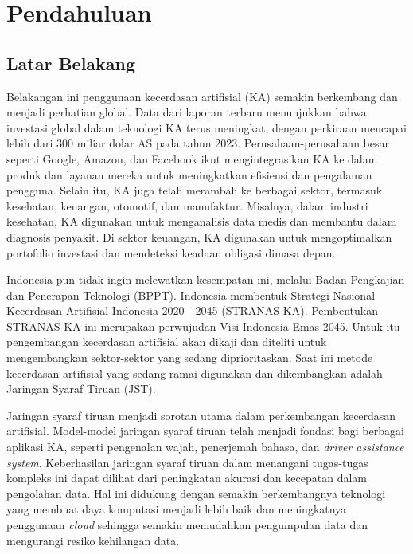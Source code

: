 \chapter{Pendahuluan}

\section{Latar Belakang}

Belakangan ini penggunaan kecerdasan artifisial (KA) semakin berkembang dan menjadi perhatian global. Data dari laporan terbaru menunjukkan bahwa investasi global dalam teknologi KA terus meningkat, dengan perkiraan mencapai lebih dari 300 miliar dolar AS pada tahun 2023\cite{300mn}. Perusahaan-perusahaan besar seperti Google, Amazon, dan Facebook ikut mengintegrasikan KA ke dalam produk dan layanan mereka untuk meningkatkan efisiensi dan pengalaman pengguna\cite{Kelleher2019-cj}. Selain itu, KA juga telah merambah ke berbagai sektor, termasuk kesehatan, keuangan, otomotif, dan manufaktur. Misalnya, dalam industri kesehatan, KA digunakan untuk menganalisis data medis dan membantu dalam diagnosis penyakit\cite{Early_Diagnosis_of_Alzheimer's_Disease}. Di sektor keuangan, KA digunakan untuk mengoptimalkan portofolio investasi dan mendeteksi keadaan obligasi dimasa depan. 

Indonesia pun tidak ingin melewatkan kesempatan ini, melalui Badan Pengkajian dan Penerapan Teknologi (BPPT). Indonesia membentuk Strategi Nasional Kecerdasan Artifisial Indonesia 2020 - 2045 (STRANAS KA)\cite{Stranaska}. Pembentukan STRANAS KA ini merupakan perwujudan Visi Indonesia Emas 2045. Untuk itu pengembangan kecerdasan artifisial akan dikaji dan diteliti untuk mengembangkan sektor-sektor yang sedang diprioritaskan. Saat ini metode kecerdasan artifisial yang sedang ramai digunakan dan dikembangkan adalah Jaringan Syaraf Tiruan (JST).

Jaringan syaraf tiruan menjadi sorotan utama dalam perkembangan kecerdasan artifisial. Model-model jaringan syaraf tiruan telah menjadi fondasi bagi berbagai aplikasi KA, seperti pengenalan wajah, penerjemah bahasa, dan \textit{driver assistance system}\cite{Auto_driving}. Keberhasilan jaringan syaraf tiruan dalam menangani tugas-tugas kompleks ini dapat dilihat dari peningkatan akurasi dan kecepatan dalam pengolahan data. Hal ini didukung dengan semakin berkembangnya teknologi yang membuat daya komputasi menjadi lebih baik dan meningkatnya penggunaan \textit{cloud} sehingga semakin memudahkan pengumpulan data dan mengurangi resiko kehilangan data. 

